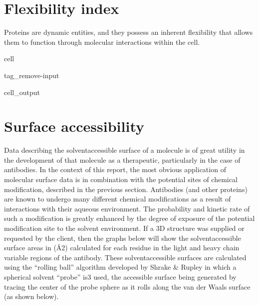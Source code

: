 \documentclass[letterpaper,10pt,english]{jupyterBook}
\begin{document}
\section{Flexibility index}
\label{\detokenize{ipynb/chapter2:flexibility-index}}
\sphinxAtStartPar
Proteins are dynamic entities, and they possess an inherent flexibility that allows them to function through molecular interactions within the cell.

\begin{sphinxuseclass}{cell}
\begin{sphinxuseclass}{tag_remove-input}\begin{sphinxVerbatimOutput}

\begin{sphinxuseclass}{cell_output}
\noindent{}

\end{sphinxuseclass}\end{sphinxVerbatimOutput}

\end{sphinxuseclass}
\end{sphinxuseclass}

\section{Surface accessibility}
\label{\detokenize{ipynb/chapter2:surface-accessibility}}
\sphinxAtStartPar
Data describing the solvent\sphinxhyphen{}accessible surface of a molecule is of great utility in the
development of that molecule as a therapeutic, particularly in the case of antibodies. In the
context of this report, the most obvious application of molecular surface data is in combination
with the potential sites of chemical modification, described in the previous section. Antibodies
(and other proteins) are known to undergo many different chemical modifications as a result of
interactions with their aqueous environment. The probability and kinetic rate of such a
modification is greatly enhanced by the degree of exposure of the potential modification site to
the solvent environment.
If a 3D structure was supplied or requested by the client, then the graphs below will show the
solvent\sphinxhyphen{}accessible surface areas in (Å2) calculated for each residue in the light and heavy chain
variable regions of the antibody. These solvent\sphinxhyphen{}accessible surfaces are calculated using the
“rolling ball” algorithm developed by Shrake \& Rupley in which a spherical solvent “probe” is3
used, the accessible surface being generated by tracing the center of the probe sphere as it
rolls along the van der Waals surface (as shown below).
\end{document}
